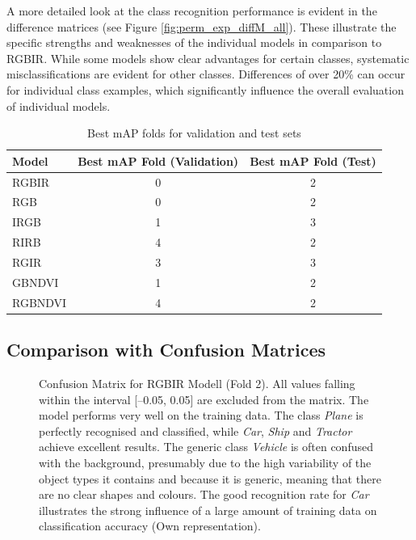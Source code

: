 A more detailed look at the class recognition performance is evident in the difference matrices (see Figure \ref{fig:perm_exp_diffM_all}). These illustrate the specific strengths and weaknesses of the individual models in comparison to RGBIR. While some models show clear advantages for certain classes, systematic misclassifications are evident for other classes. Differences of over 20\% can occur for individual class examples, which significantly influence the overall evaluation of individual models.
  






\begin{table}[h!]
\centering

\begin{tabular}{lcc}
\hline
\textbf{Model} & \textbf{Best mAP Fold (Validation)} & \textbf{Best mAP Fold (Test)} \\ \hline
RGBIR    & 0 & 2 \\
RGB      & 0 & 2 \\
IRGB     & 1 & 3 \\
RIRB     & 4 & 2 \\
RGIR     & 3 & 3 \\
GBNDVI   & 1 & 2 \\
RGBNDVI  & 4 & 2 \\ \hline
\end{tabular}
\caption{Best mAP folds for validation and test sets}
\label{tab:best_map_fold_perm_exp}
\end{table}




\FloatBarrier
\subsection{Comparison with Confusion Matrices}
\label{subsec:permexp_comp_confusion_matric}


\begin{figure}[htbp]
    \centering
    
    \caption[Confusion Matrix for RGBIR Modell (Fold 2)]{Confusion Matrix for RGBIR Modell (Fold 2). All values falling within the interval [–0.05, 0.05] are excluded from the matrix. The model performs very well on the training data. The class \textit{Plane} is perfectly recognised and classified, while \textit{Car}, \textit{Ship} and \textit{Tractor} achieve excellent results. The generic class \textit{Vehicle} is often confused with the background, presumably due to the high variability of the object types it contains and because it is generic, meaning that there are no clear shapes and colours. The good recognition rate for \textit{Car} illustrates the strong influence of a large amount of training data on classification accuracy (Own representation).}
    \label{fig:perm_exp_confM_rgbir_f2}
\end{figure}

